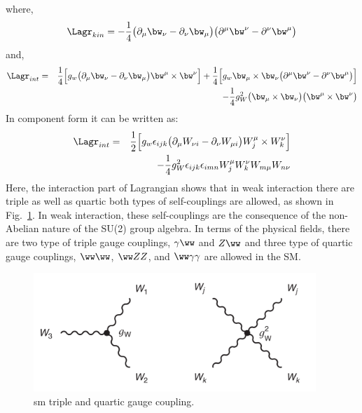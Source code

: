 where,
\begin{equation}
    \Lagr_{kin} = -\frac{1}{4} \big( \partial_{\mu} \bw_{\nu} - \partial_{\nu} \bw_{\mu} \big) \big( \partial^{\mu} \bw^{\nu} - \partial^{\nu} \bw^{\mu} \big) \nonumber
\end{equation}
and,
\begin{eqnarray}
    \Lagr_{int} & = &  \frac{1}{4} \Big[  g_w\big( \partial_{\mu} \bw_{\nu} - \partial_{\nu} \bw_{\mu} \big)\bw^{\mu} \times \bw^{\nu} \Big] + \frac{1}{4} \Big[  g_w \bw_{\mu} \times \bw_{\nu}  \big( \partial^{\mu} \bw^{\nu} - \partial^{\nu} \bw^{\mu} \big)\Big] \nonumber \\
        &   & - \frac{1}{4} g_W^2 \big(\bw_{\mu} \times \bw_{\nu}\big) \big(\bw^{\mu} \times \bw^{\nu}\big) 
\end{eqnarray}
In component form it can be written as:
\begin{eqnarray}
    \Lagr_{int} & = & \frac{1}{2} \Big[  g_w \epsilon_{ijk}\big( \partial_{\mu} W_{\nu i} - \partial_{\nu} W_{\mu i} \big)W^{\mu}_j \times W^{\nu}_k \Big] \nonumber \\
        &   & - \frac{1}{4} g_W^2 \epsilon_{ijk} \epsilon_{imn} W^{\mu}_j W^{\nu}_k W_{m \mu} W_{n \nu}
\end{eqnarray}
Here, the interaction part of Lagrangian shows that in weak interaction there are triple as well as quartic both types of self-couplings are allowed, as shown in Fig.~\ref{fig:sm_triple_quartic}. In weak interaction, these self-couplings are the consequence of the non-Abelian nature of the SU(2) group algebra. In terms of the physical fields, there are two type of triple gauge couplings, $\gamma \ww$ and $Z \ww$ and three type of quartic gauge couplings, $\ww \ww$, $\ww ZZ$, and $\ww \gamma \gamma$ are allowed in the SM.
\begin{figure}[htbp]
    \centering
    \includegraphics[width=0.95\textwidth]{Pictures/sm-triple-quarticgc.png}
    \caption{sm triple and quartic gauge coupling.}
    \label{fig:sm_triple_quartic}
\end{figure}


